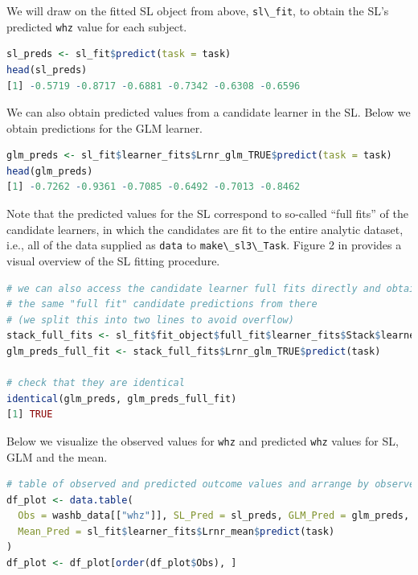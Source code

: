 \documentclass[
  12pt, krantz2,
]{krantz}
\newcommand{\passthrough}[1]{#1}
\newcommand{\1}{\mathbbm{1}}
\theoremstyle{definition}
\theoremstyle{definition}
\theoremstyle{definition}
\theoremstyle{definition}
\theoremstyle{remark}
\begin{document}
We will draw on the fitted SL object from above, \passthrough{\lstinline!sl\_fit!}, to obtain the
SL's predicted \passthrough{\lstinline!whz!} value for each subject.

\begin{lstlisting}[language=R]
sl_preds <- sl_fit$predict(task = task)
head(sl_preds)
[1] -0.5719 -0.8717 -0.6881 -0.7342 -0.6308 -0.6596
\end{lstlisting}

We can also obtain predicted values from a candidate learner in the SL. Below
we obtain predictions for the GLM learner.

\begin{lstlisting}[language=R]
glm_preds <- sl_fit$learner_fits$Lrnr_glm_TRUE$predict(task = task)
head(glm_preds)
[1] -0.7262 -0.9361 -0.7085 -0.6492 -0.7013 -0.8462
\end{lstlisting}

Note that the predicted values for the SL correspond to so-called ``full fits''
of the candidate learners, in which the candidates are fit to the entire
analytic dataset, i.e., all of the data supplied as \passthrough{\lstinline!data!} to \passthrough{\lstinline!make\_sl3\_Task!}.
Figure 2 in \citet{rvp2022super} provides a visual overview of the SL fitting
procedure.

\begin{lstlisting}[language=R]
# we can also access the candidate learner full fits directly and obtain
# the same "full fit" candidate predictions from there 
# (we split this into two lines to avoid overflow)
stack_full_fits <- sl_fit$fit_object$full_fit$learner_fits$Stack$learner_fits
glm_preds_full_fit <- stack_full_fits$Lrnr_glm_TRUE$predict(task)

# check that they are identical
identical(glm_preds, glm_preds_full_fit)
[1] TRUE
\end{lstlisting}

Below we visualize the observed values for \passthrough{\lstinline!whz!} and predicted \passthrough{\lstinline!whz!} values for
SL, GLM and the mean.

\begin{lstlisting}[language=R]
# table of observed and predicted outcome values and arrange by observed values
df_plot <- data.table(
  Obs = washb_data[["whz"]], SL_Pred = sl_preds, GLM_Pred = glm_preds,
  Mean_Pred = sl_fit$learner_fits$Lrnr_mean$predict(task)
)
df_plot <- df_plot[order(df_plot$Obs), ] 
\end{lstlisting}
\end{document}
